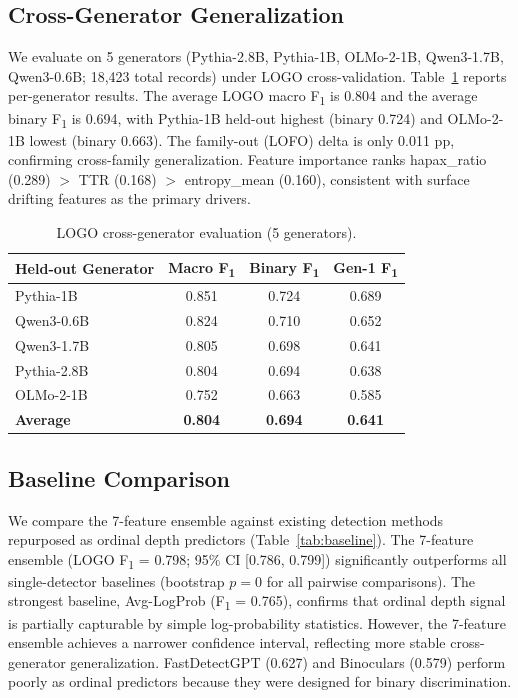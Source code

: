 \documentclass[11pt,a4paper]{article}
\newcommand{\fone}{F\textsubscript{1}}
\begin{document}
\subsection{Cross-Generator Generalization}
\label{sec:cross_gen}

We evaluate on 5 generators (Pythia-2.8B, Pythia-1B, OLMo-2-1B, Qwen3-1.7B, Qwen3-0.6B; 18,423 total records)
under LOGO cross-validation.
Table~\ref{tab:logo} reports per-generator results.
The average LOGO macro \fone{} is 0.804 and the average binary \fone{} is 0.694,
with Pythia-1B held-out highest (binary 0.724) and OLMo-2-1B lowest (binary 0.663).
The family-out (LOFO) delta is only 0.011 pp, confirming cross-family generalization.
Feature importance ranks hapax\_ratio (0.289) $>$ TTR (0.168) $>$ entropy\_mean (0.160),
consistent with surface drifting features as the primary drivers.

\begin{table}[t]
\centering
\caption{LOGO cross-generator evaluation (5 generators).}
\label{tab:logo}
\begin{tabular}{lccc}
\toprule
\textbf{Held-out Generator} & \textbf{Macro \fone{}} & \textbf{Binary \fone{}} & \textbf{Gen-1 \fone{}} \\
\midrule
Pythia-1B & 0.851 & 0.724 & 0.689 \\
Qwen3-0.6B & 0.824 & 0.710 & 0.652 \\
Qwen3-1.7B & 0.805 & 0.698 & 0.641 \\
Pythia-2.8B & 0.804 & 0.694 & 0.638 \\
OLMo-2-1B & 0.752 & 0.663 & 0.585 \\
\midrule
\textbf{Average} & \textbf{0.804} & \textbf{0.694} & \textbf{0.641} \\
\bottomrule
\end{tabular}
\end{table}

\subsection{Baseline Comparison}
\label{sec:baselines}

We compare the 7-feature ensemble against existing detection methods repurposed as ordinal depth predictors
(Table~\ref{tab:baseline}).
The 7-feature ensemble (LOGO \fone{} = 0.798; 95\% CI [0.786, 0.799]) significantly outperforms all single-detector baselines
(bootstrap $p = 0$ for all pairwise comparisons).
The strongest baseline, Avg-LogProb (\fone{} = 0.765), confirms that ordinal depth signal is partially capturable by simple log-probability statistics.
However, the 7-feature ensemble achieves a narrower confidence interval, reflecting more stable cross-generator generalization.
FastDetectGPT (0.627) and Binoculars (0.579) perform poorly as ordinal predictors because they were designed for binary discrimination.
\end{document}
